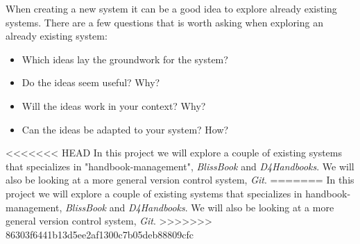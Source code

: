 When creating a new system it can be a good idea to explore already existing systems.%
There are a few questions that is worth asking when exploring an already existing system:

\begin{itemize}
  \item Which ideas lay the groundwork for the system?
  \item Do the ideas seem useful? Why?
  \item Will the ideas work in your context? Why?
  \item Can the ideas be adapted to your system? How?
\end{itemize}


<<<<<<< HEAD
In this project we will explore a couple of existing systems that specializes in "handbook-management", \textit{BlissBook} and \textit{D4Handbooks}. We will also be looking at a more general version control system, \textit{Git}. %
=======
In this project we will explore a couple of existing systems that specializes in handbook-management, \textit{BlissBook} and \textit{D4Handbooks}. We will also be looking at a more general version control system, \textit{Git}.
>>>>>>> 86303f6441b13d5ee2af1300c7b05deb88809cfc
